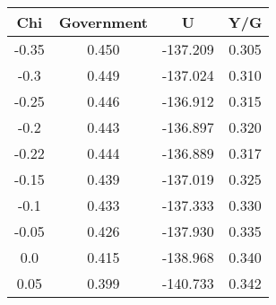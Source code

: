 \begin{tabular}{c c c c}
\hline
Chi & Government & U & Y/G \\
\hline
-0.35 & 0.450 & -137.209 & 0.305 \\
-0.3 & 0.449 & -137.024 & 0.310 \\
-0.25 & 0.446 & -136.912 & 0.315 \\
-0.2 & 0.443 & -136.897 & 0.320 \\
-0.22 & 0.444 & -136.889 & 0.317 \\
-0.15 & 0.439 & -137.019 & 0.325 \\
-0.1 & 0.433 & -137.333 & 0.330 \\
-0.05 & 0.426 & -137.930 & 0.335 \\
0.0 & 0.415 & -138.968 & 0.340 \\
0.05 & 0.399 & -140.733 & 0.342 \\
\hline
\end{tabular}
